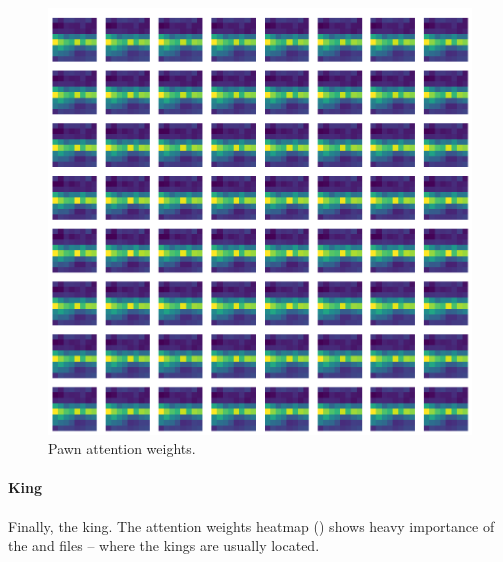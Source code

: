 \begin{figure}[H]
\begin{minipage}{0.475\textwidth}
    \includegraphics[width=\textwidth]{project/img/attention_maps/P_weights_6.png}
    \caption{Pawn attention weights.}
    \label{atnP1}
  \end{minipage}
\end{figure}

\newpage

\paragraph{King} Finally, the king. The attention weights heatmap
() shows heavy importance of the  and  files -- where
the kings are usually located.


